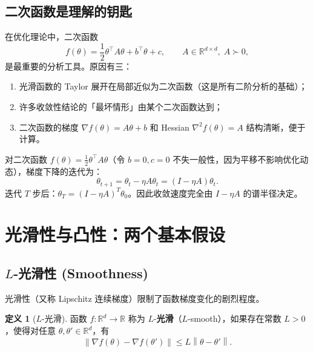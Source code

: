 \documentclass[12pt,a4paper]{ctexart}
\theoremstyle{definition}
\newtheorem{definition}{定义}[section]
\theoremstyle{plain}
\newcommand{\R}{\mathbb{R}}
\newcommand{\grad}{\nabla}
\newcommand{\norm}[1]{\left\lVert #1 \right\rVert}
\begin{document}
\subsection{二次函数是理解的钥匙}

在优化理论中，二次函数
\begin{equation}\label{eq:quadratic}
  f(\theta) = \frac{1}{2}\theta^\top A \theta + b^\top \theta + c,\qquad A \in \R^{d\times d},\; A \succ 0,
\end{equation}
是最重要的分析工具。原因有三：
\begin{enumerate}[label=(\arabic*)]
  \item 光滑函数的 Taylor 展开在局部近似为二次函数（这是所有二阶分析的基础）；
  \item 许多收敛性结论的「最坏情形」由某个二次函数达到；
  \item 二次函数的梯度 $\grad f(\theta) = A\theta + b$ 和 Hessian $\grad^2 f(\theta) = A$ 结构清晰，便于计算。
\end{enumerate}

对二次函数 $f(\theta) = \frac12\theta^\top A\theta$（令 $b=0, c=0$ 不失一般性，因为平移不影响优化动态），梯度下降的迭代为：
\begin{equation}
  \theta_{t+1} = \theta_t - \eta A \theta_t = (I - \eta A)\theta_t.
\end{equation}
迭代 $T$ 步后：$\theta_T = (I - \eta A)^T \theta_0$。因此收敛速度完全由 $I - \eta A$ 的谱半径决定。

\section{光滑性与凸性：两个基本假设}

\subsection{$L$-光滑性 (Smoothness)}

光滑性（又称 Lipschitz 连续梯度）限制了函数梯度变化的剧烈程度。

\begin{definition}[$L$-光滑]\label{def:smooth}
  函数 $f:\R^d \to \R$ 称为 $L$-\textbf{光滑}（$L$-smooth），如果存在常数 $L > 0$，使得对任意 $\theta, \theta' \in \R^d$，有
  \begin{equation}\label{eq:smooth1}
    \norm{\grad f(\theta) - \grad f(\theta')} \le L \norm{\theta - \theta'}.
  \end{equation}
\end{definition}
\end{document}
